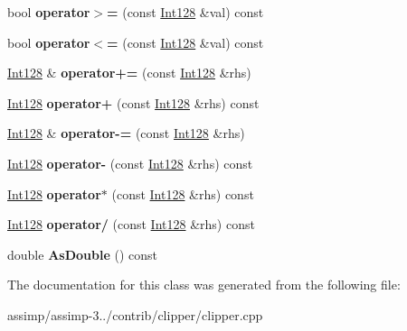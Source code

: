 \begin{DoxyCompactItemize}
\item 
\hypertarget{class_clipper_lib_1_1_int128_a1e8869c867b94465a5e4b54de49d6c11}{bool {\bfseries operator$>$=} (const \hyperlink{class_clipper_lib_1_1_int128}{Int128} \&val) const }\label{class_clipper_lib_1_1_int128_a1e8869c867b94465a5e4b54de49d6c11}

\item 
\hypertarget{class_clipper_lib_1_1_int128_a2c45d01fdcbf15015aff79d491c97416}{bool {\bfseries operator$<$=} (const \hyperlink{class_clipper_lib_1_1_int128}{Int128} \&val) const }\label{class_clipper_lib_1_1_int128_a2c45d01fdcbf15015aff79d491c97416}

\item 
\hypertarget{class_clipper_lib_1_1_int128_ad48a700134ab5c4e08bd53966b731950}{\hyperlink{class_clipper_lib_1_1_int128}{Int128} \& {\bfseries operator+=} (const \hyperlink{class_clipper_lib_1_1_int128}{Int128} \&rhs)}\label{class_clipper_lib_1_1_int128_ad48a700134ab5c4e08bd53966b731950}

\item 
\hypertarget{class_clipper_lib_1_1_int128_acb2d49860fb6ddf5b598ac6e15ac9521}{\hyperlink{class_clipper_lib_1_1_int128}{Int128} {\bfseries operator+} (const \hyperlink{class_clipper_lib_1_1_int128}{Int128} \&rhs) const }\label{class_clipper_lib_1_1_int128_acb2d49860fb6ddf5b598ac6e15ac9521}

\item 
\hypertarget{class_clipper_lib_1_1_int128_a7b35c74c15392ae8d48c031f750c1b28}{\hyperlink{class_clipper_lib_1_1_int128}{Int128} \& {\bfseries operator-\/=} (const \hyperlink{class_clipper_lib_1_1_int128}{Int128} \&rhs)}\label{class_clipper_lib_1_1_int128_a7b35c74c15392ae8d48c031f750c1b28}

\item 
\hypertarget{class_clipper_lib_1_1_int128_a9ab61c357c61a3f3ad5fc628e36879e2}{\hyperlink{class_clipper_lib_1_1_int128}{Int128} {\bfseries operator-\/} (const \hyperlink{class_clipper_lib_1_1_int128}{Int128} \&rhs) const }\label{class_clipper_lib_1_1_int128_a9ab61c357c61a3f3ad5fc628e36879e2}

\item 
\hypertarget{class_clipper_lib_1_1_int128_a2f7eb4303e7d336e21b55ebdd91a9bf5}{\hyperlink{class_clipper_lib_1_1_int128}{Int128} {\bfseries operator$\ast$} (const \hyperlink{class_clipper_lib_1_1_int128}{Int128} \&rhs) const }\label{class_clipper_lib_1_1_int128_a2f7eb4303e7d336e21b55ebdd91a9bf5}

\item 
\hypertarget{class_clipper_lib_1_1_int128_a91718f7da0f2442e03e69b019f21dd7d}{\hyperlink{class_clipper_lib_1_1_int128}{Int128} {\bfseries operator/} (const \hyperlink{class_clipper_lib_1_1_int128}{Int128} \&rhs) const }\label{class_clipper_lib_1_1_int128_a91718f7da0f2442e03e69b019f21dd7d}

\item 
\hypertarget{class_clipper_lib_1_1_int128_a6629ebee1d059ea486c789eaa24fb994}{double {\bfseries As\+Double} () const }\label{class_clipper_lib_1_1_int128_a6629ebee1d059ea486c789eaa24fb994}

\end{DoxyCompactItemize}


The documentation for this class was generated from the following file\+:\begin{DoxyCompactItemize}
\item 
assimp/assimp-\/3../contrib/clipper/clipper.\+cpp\end{DoxyCompactItemize}
